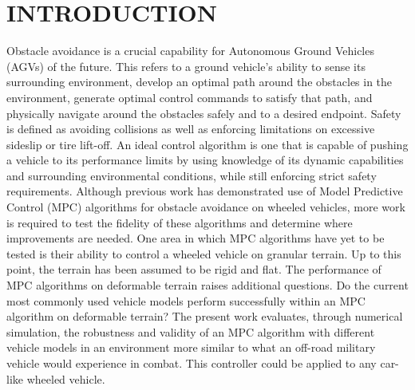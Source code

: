 \documentclass[12pt,onecolumn]{report}
\begin{document}
\newpage
{}
\setcounter{page}{1}
\chapter{INTRODUCTION}\label{c:introduction}

Obstacle avoidance is a crucial capability for Autonomous Ground Vehicles (AGVs) of the future. This refers to a ground vehicle's ability to sense its surrounding environment, develop an optimal path around the obstacles in the environment, generate optimal control commands to satisfy that path, and physically navigate around the obstacles safely and to a desired endpoint. Safety is defined as avoiding collisions as well as enforcing limitations on excessive sideslip or tire lift-off. An ideal control algorithm is one that is capable of pushing a vehicle to its performance limits by using knowledge of its dynamic capabilities and surrounding environmental conditions, while still enforcing strict safety requirements. Although previous work has demonstrated use of Model Predictive Control (MPC) algorithms for obstacle avoidance on wheeled vehicles, more work is required to test the fidelity of these algorithms and determine where improvements are needed. One area in which MPC algorithms have yet to be tested is their ability to control a wheeled vehicle on granular terrain. Up to this point, the terrain has been assumed to be rigid and flat. The performance of MPC algorithms on deformable terrain raises additional questions. Do the current most commonly used vehicle models perform successfully within an MPC algorithm on deformable terrain? The present work evaluates, through numerical simulation, the robustness and validity of an MPC algorithm with different vehicle models in an environment more similar to what an off-road military vehicle would experience in combat. This controller could be applied to any car-like wheeled vehicle.
\end{document}
